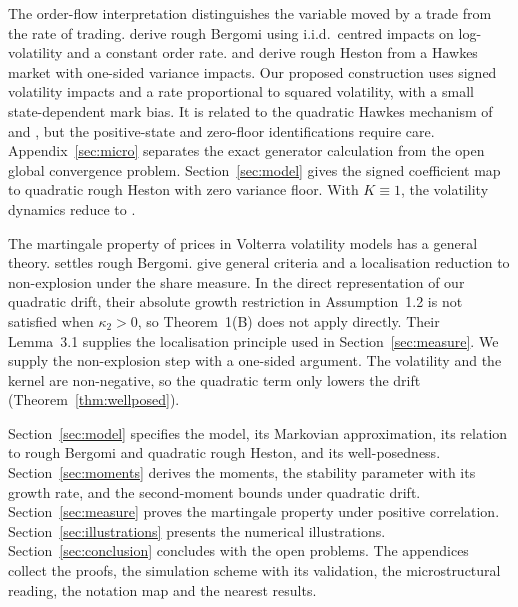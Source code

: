 The order-flow interpretation distinguishes the variable moved by a trade from the rate of trading. \citet{HagerHorstWagenhoferXu2026} derive rough Bergomi using i.i.d.\ centred impacts on log-volatility and a constant order rate. \citet{JaissonRosenbaum2016} and \citet{ElEuchFukasawaRosenbaum2018} derive rough Heston from a Hawkes market with one-sided variance impacts. Our proposed construction uses signed volatility impacts and a rate proportional to squared volatility, with a small state-dependent mark bias. It is related to the quadratic Hawkes mechanism of \citet{BlancDonierBouchaud2017} and \citet{DandapaniJusselinRosenbaum2021}, but the positive-state and zero-floor identifications require care. Appendix~\ref{sec:micro} separates the exact generator calculation from the open global convergence problem. Section~\ref{sec:model} gives the signed coefficient map to quadratic rough Heston with zero variance floor. With $K\equiv1$, the volatility dynamics reduce to \citet{SeppRakhmonov2023}.

The martingale property of prices in Volterra volatility models has a general theory. \citet{Gassiat2019} settles rough Bergomi. \citet{GuyonJeanninJourdain2026} give general criteria and a localisation reduction to non-explosion under the share measure. In the direct representation of our quadratic drift, their absolute growth restriction in Assumption~1.2 is not satisfied when $\kappa_2>0$, so Theorem~1(B) does not apply directly. Their Lemma~3.1 supplies the localisation principle used in Section~\ref{sec:measure}. We supply the non-explosion step with a one-sided argument. The volatility and the kernel are non-negative, so the quadratic term only lowers the drift (Theorem~\ref{thm:wellposed}).

Section~\ref{sec:model} specifies the model, its Markovian approximation, its relation to rough Bergomi and quadratic rough Heston, and its well-posedness. Section~\ref{sec:moments} derives the moments, the stability parameter with its growth rate, and the second-moment bounds under quadratic drift. Section~\ref{sec:measure} proves the martingale property under positive correlation. Section~\ref{sec:illustrations} presents the numerical illustrations. Section~\ref{sec:conclusion} concludes with the open problems. The appendices collect the proofs, the simulation scheme with its validation, the microstructural reading, the notation map and the nearest results.

